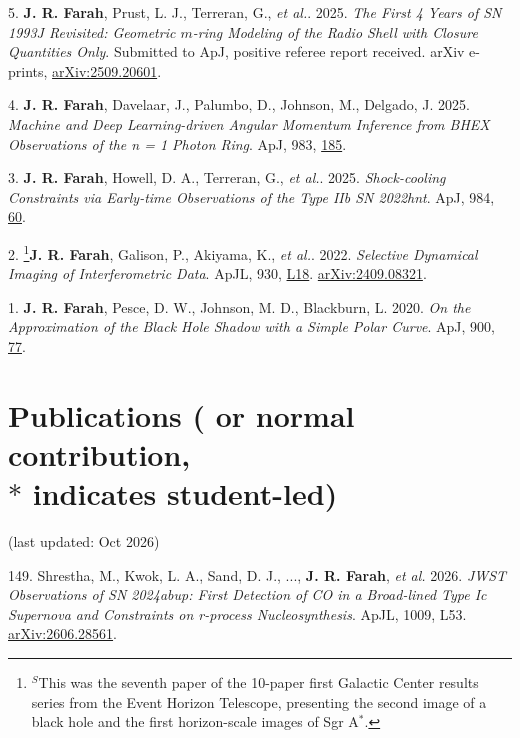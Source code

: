 \documentclass[margin,line]{res}
\newcommand{\apj}{ApJ}                    %
\newcommand{\apjl}{ApJL}                  %
\begin{document}
\begin{resume}
5. \textbf{J. R. Farah}, Prust, L. J., Terreran, G., \textit{et al.}. 2025. \textit{The First 4 Years of SN 1993J Revisited: Geometric $m$-ring Modeling of the Radio Shell with Closure Quantities Only}. Submitted to ApJ, positive referee report received. arXiv e-prints, \href{https://arxiv.org/abs/2509.20601}{arXiv:2509.20601}.

4. \textbf{J. R. Farah}, Davelaar, J., Palumbo, D., Johnson, M., Delgado, J. 2025. \textit{Machine and Deep Learning-driven Angular Momentum Inference from BHEX Observations of the n = 1 Photon Ring}. \apj, 983, \href{https://iopscience.iop.org/article/10.3847/1538-4357/adbbe3}{185}. 

3. \textbf{J. R. Farah}, Howell, D. A., Terreran, G., \textit{et al.}. 2025. \textit{Shock-cooling Constraints via Early-time Observations of the Type IIb SN 2022hnt}. \apj, 984, \href{https://iopscience.iop.org/article/10.3847/1538-4357/adad5a}{60}. 


2. \footnote[$^S$]{\noindent $^S$This was the seventh paper of the 10-paper first Galactic Center results series from the Event Horizon Telescope, presenting the second image of a black hole and the first horizon-scale images of Sgr A$^\ast$.}\textbf{J. R. Farah}, Galison, P., Akiyama, K., \textit{et al.}. 2022. \textit{Selective Dynamical Imaging of Interferometric Data}. \apjl, 930, \href{https://iopscience.iop.org/article/10.3847/2041-8213/ac6615}{L18}. \href{https://arxiv.org/abs/2409.08321}{arXiv:2409.08321}.

1. \textbf{J. R. Farah}, Pesce, D. W., Johnson, M. D., Blackburn, L. 2020. \textit{On the Approximation of the Black Hole Shadow with a Simple Polar Curve}. \apj, 900, \href{https://iopscience.iop.org/article/10.3847/1538-4357/aba59a}{77}. 




\vspace{+.4cm}
\section{\sc Publications ( or normal contribution, \\$\ast$ indicates student-led) } 
\label{sec:publications}


(last updated: Oct 2026)

149. Shrestha, M., Kwok, L. A., Sand, D. J., ..., \textbf{J. R. Farah}, \textit{et al.} 2026. \textit{JWST Observations of SN 2024abup: First Detection of CO in a Broad-lined Type Ic Supernova and Constraints on r-process Nucleosynthesis}. \apjl, 1009, L53. \href{https://arxiv.org/abs/2606.28561}{arXiv:2606.28561}.


\end{resume}
\end{document}
